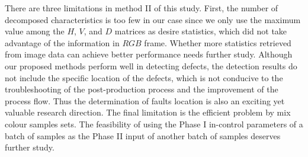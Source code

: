There are three limitations in method II of this study. First, the number of decomposed characteristics is too few in our case since we only use the maximum value among the $H$, $V$, and $D$ matrices as desire statistics, which did not take advantage of the information in $RGB$ frame. Whether more statistics retrieved from image data can achieve better performance needs further study. Although our proposed methods perform well in detecting defects, the detection results do not include the specific location of the defects, which is not conducive to the troubleshooting of the post-production process and the improvement of the process flow. Thus the determination of faults location is also an exciting yet valuable research direction. The final limitation is the efficient problem by mix colour samples sets. The feasibility of using the Phase I in-control parameters of a batch of samples as the Phase II input of another batch of samples deserves further study.

